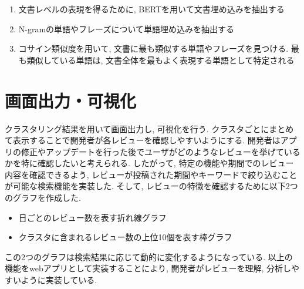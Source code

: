 \begin{enumerate}
  \item 文書レベルの表現を得るために, BERTを用いて文書埋め込みを抽出する
  \item N-gramの単語やフレーズについて単語埋め込みを抽出する
  \item コサイン類似度を用いて, 文書に最も類似する単語やフレーズを見つける. 最も類似している単語は, 文書全体を最もよく表現する単語として特定される
\end{enumerate}


\section{画面出力・可視化}
クラスタリング結果を用いて画面出力し, 可視化を行う. クラスタごとにまとめて表示することで開発者が各レビューを確認しやすいようにする. 
開発者はアプリの修正やアップデートを行った後でユーザがどのようなレビューを挙げているかを特に確認したいと考えられる. したがって, 特定の機能や期間でのレビュー内容を確認できるよう, レビューが投稿された期間やキーワードで絞り込むことが可能な検索機能を実装した. 
そして, レビューの特徴を確認するために以下2つのグラフを作成した.
\begin{itemize}
  \item 日ごとのレビュー数を表す折れ線グラフ
  \item クラスタに含まれるレビュー数の上位10個を表す棒グラフ
\end{itemize}
この2つのグラフは検索結果に応じて動的に変化するようになっている. 以上の機能をwebアプリとして実装することにより, 開発者がレビューを理解, 分析しやすいように実装している. 